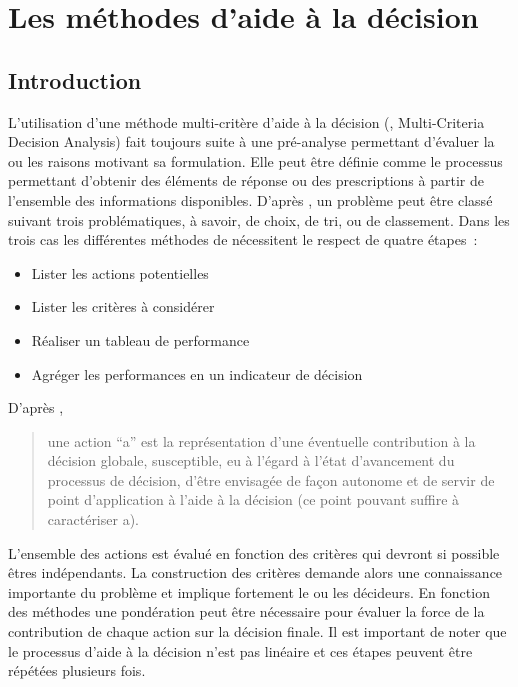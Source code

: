 

\section{Les méthodes d’aide à la décision} %
\label{sec:les_methodes_d_aide_a_la_decision}
\subsection{Introduction} %
\label{sub:mcda_introduction}
L’utilisation d’une méthode multi-critère d’aide à la décision (, Multi-Criteria
Decision Analysis) fait toujours suite à une pré-analyse permettant d’évaluer la ou les
raisons motivant sa formulation. Elle peut être définie comme le processus permettant
d’obtenir des éléments de réponse ou des prescriptions à partir de l’ensemble des
informations disponibles. D’après \textcite{Roy1996}, un problème peut être
classé suivant trois problématiques, à savoir, de choix, de tri, ou de classement. Dans les
trois cas les différentes méthodes de  nécessitent le respect de quatre étapes~:
\begin{itemize}
  \item Lister les actions potentielles
  \item Lister les critères à considérer
  \item Réaliser un tableau de performance
  \item Agréger les performances en un indicateur de décision
\end{itemize}

\noindent D’après \textcite{Roy1985}, \blockquote{une action \enquote{a} est la représentation d’une
éventuelle contribution à la décision globale, susceptible, eu à l’égard à l’état
d’avancement du processus de décision, d’être envisagée de façon autonome et de servir de
point d’application à l’aide à la décision (ce point pouvant suffire à caractériser a).}
L’ensemble des actions est évalué en fonction des critères qui devront si possible êtres
indépendants. La construction des critères demande alors une connaissance importante du
problème et implique fortement le ou les décideurs. En fonction des méthodes une
pondération peut être nécessaire pour évaluer la force de la contribution de chaque action
sur la décision finale. Il est important de noter que le processus d’aide à la décision
n’est pas linéaire et ces étapes peuvent être répétées plusieurs fois.

